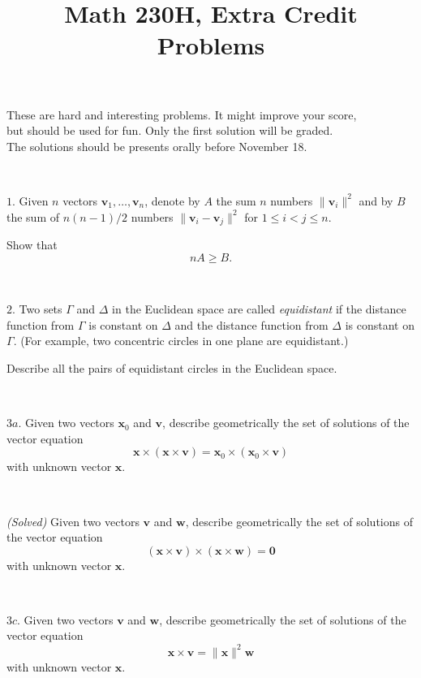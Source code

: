 \documentclass{article}
\def\noi{\noindent}%
\def\ge{\geqslant}%
\def\le{\leqslant}%
\begin{document}
\title{Math 230H, Extra Credit Problems}
\author{}
\date{}
\maketitle

\begin{center}
{\small These are hard and interesting problems.
It might improve your score,\\
but should be used for fun. 
Only the first solution will be graded. 
\\ The solutions should 
be presents orally before November 18.}
\end{center}
\thispagestyle{empty}

\ 

\noi $1$. 
Given $n$ vectors $\mathbf{v}_1,\dots,\mathbf{v}_n$, 
denote by $A$ the sum $n$ numbers $\|\mathbf{v}_i\|^2$
and by $B$ the sum of $n(n-1)/2$ numbers 
$\|\mathbf{v}_i-\mathbf{v}_j\|^2$ for $1\le i<j\le n$.

Show that 
\[n A\ge B.\]

\ 

\noi
$2$. 
Two sets $\Gamma$ and $\Delta$ in the Euclidean space 
are called \emph{equidistant} if the distance function from $\Gamma$ is constant on $\Delta$ and the distance function from $\Delta$ is constant on $\Gamma$.
(For example, two concentric circles in one plane are equidistant.)

Describe all the pairs of equidistant circles in the Euclidean space.

\ 

\noi
$3a$. 
Given two vectors $\mathbf{x}_0$ and $\mathbf{v}$,
describe geometrically the set of solutions of the vector equation
\[\mathbf{x}\times(\mathbf{x}\times\mathbf{v})=\mathbf{x}_0\times(\mathbf{x}_0\times\mathbf{v})\]
with unknown vector  $\mathbf{x}$.

\ 

\noi
{}\textit{(Solved)} 
Given two vectors $\mathbf{v}$ and $\mathbf{w}$,
describe geometrically the set of solutions of the vector equation
\[(\mathbf{x}\times\mathbf{v})\times(\mathbf{x}\times\mathbf{w})=\mathbf{0}\]
with unknown vector  $\mathbf{x}$.

\ 

\noi
$3c$. 
Given two vectors $\mathbf{v}$ and $\mathbf{w}$,
describe geometrically the set of solutions of the vector equation
\[\mathbf{x}\times\mathbf{v}=\|\mathbf{x}\|^2\mathbf{w}\]
with unknown vector  $\mathbf{x}$.

\ 
\end{document}
